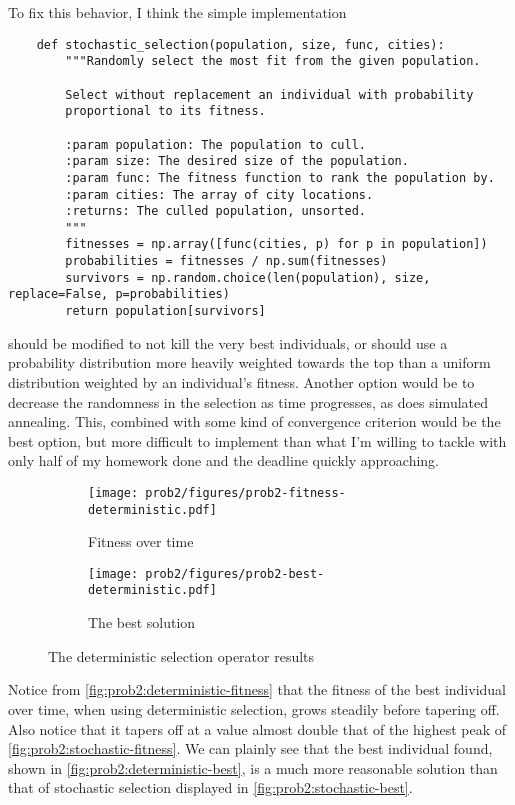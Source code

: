 \documentclass{article}
\begin{document}
To fix this behavior, I think the simple implementation
\begin{verbatim}
    def stochastic_selection(population, size, func, cities):
        """Randomly select the most fit from the given population.

        Select without replacement an individual with probability
        proportional to its fitness.

        :param population: The population to cull.
        :param size: The desired size of the population.
        :param func: The fitness function to rank the population by.
        :param cities: The array of city locations.
        :returns: The culled population, unsorted.
        """
        fitnesses = np.array([func(cities, p) for p in population])
        probabilities = fitnesses / np.sum(fitnesses)
        survivors = np.random.choice(len(population), size, replace=False, p=probabilities)
        return population[survivors]
\end{verbatim}
should be modified to not kill the very best individuals, or should use a probability distribution
more heavily weighted towards the top than a uniform distribution weighted by an individual's
fitness. Another option would be to decrease the randomness in the selection as time progresses, as
does simulated annealing. This, combined with some kind of convergence criterion would be the best
option, but more difficult to implement than what I'm willing to tackle with only half of my
homework done and the deadline quickly approaching.

\begin{figure}[h]
    \centering
    \begin{subfigure}[b]{0.45\textwidth}
        \texttt{[image: prob2/figures/prob2-fitness-deterministic.pdf]}
        \caption{Fitness over time}\label{fig:prob2:deterministic-fitness}
    \end{subfigure}
    \begin{subfigure}[b]{0.45\textwidth}
        \texttt{[image: prob2/figures/prob2-best-deterministic.pdf]}
        \caption{The best solution}\label{fig:prob2:deterministic-best}
    \end{subfigure}
    \caption{The deterministic selection operator results}\label{fig:prob2:deterministic-selection}
\end{figure}

Notice from \autoref{fig:prob2:deterministic-fitness} that the fitness of the best individual over
time, when using deterministic selection, grows steadily before tapering off. Also notice that it
tapers off at a value almost double that of the highest peak of
\autoref{fig:prob2:stochastic-fitness}. We can plainly see that the best individual found, shown in
\autoref{fig:prob2:deterministic-best}, is a much more reasonable solution than that of stochastic
selection displayed in \autoref{fig:prob2:stochastic-best}.
\end{document}
